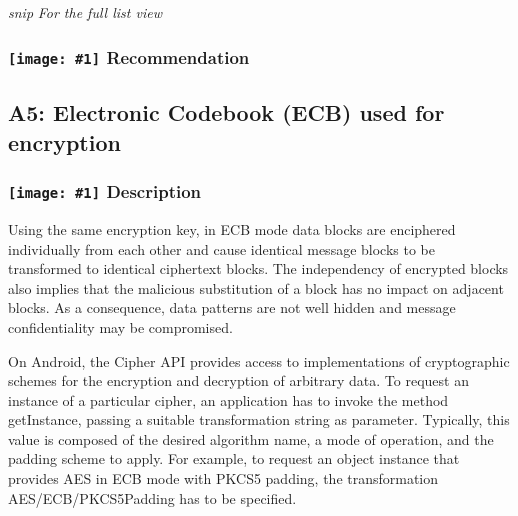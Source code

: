 \documentclass[12p]{article}
\newcommand{\icon}[1]{\texttt{[image: \#1]}}
\begin{document}



\textit{snip}
\newline \textsl{For the full list view }
\subsubsection*{\protect\icon{/home/miki/Documents/GITHUB/AndroidPermissions/python/vulns/report_icons/basic_todo.png} Recommendation}

\subsection{A5: Electronic Codebook (ECB) used for encryption}
\subsubsection*{\protect\icon{/home/miki/Documents/GITHUB/AndroidPermissions/python/vulns/report_icons/basic_sheet.png} Description}

            Using the same encryption key, in ECB mode data blocks are enciphered individually 
            from each other and cause identical message blocks to be transformed to identical ciphertext 
            blocks. The independency of encrypted blocks also implies that the malicious substitution of a 
            block has no impact on adjacent blocks. As a consequence, data patterns are not well hidden and 
            message confidentiality may be compromised.
            
            On Android, the Cipher API provides access to implementations of cryptographic schemes
            for the encryption and decryption of arbitrary data. To request an instance of a particular cipher,
            an application has to invoke the method getInstance, passing a suitable transformation string as
            parameter. Typically, this value is composed of the desired algorithm name, a mode of operation,
            and the padding scheme to apply. For example, to request an object instance that provides AES in
            ECB mode with PKCS5 padding, the transformation AES/ECB/PKCS5Padding has to be specified.
            
\end{document}
